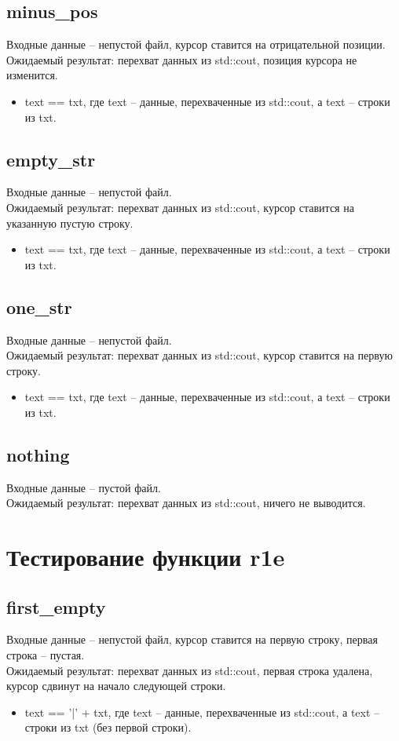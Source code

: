 \documentclass{article}
\begin{document}
\subsection{minus\_pos}
Входные данные -- непустой файл, курсор ставится на отрицательной позиции.\\
Ожидаемый результат: перехват данных из std::cout, позиция курсора не изменится.
\begin{itemize}
    \item text == txt, где text -- данные, перехваченные из std::cout, а text -- строки из txt.
\end{itemize}
\subsection{empty\_str}
Входные данные -- непустой файл.\\
Ожидаемый результат: перехват данных из std::cout, курсор ставится на указанную пустую строку.
\begin{itemize}
    \item text == txt, где text -- данные, перехваченные из std::cout, а text -- строки из txt.
\end{itemize}
\subsection{one\_str}
Входные данные -- непустой файл.\\
Ожидаемый результат: перехват данных из std::cout, курсор ставится на первую строку.
\begin{itemize}
    \item text == txt, где text -- данные, перехваченные из std::cout, а text -- строки из txt.
\end{itemize}
\subsection{nothing}
Входные данные -- пустой файл.\\
Ожидаемый результат: перехват данных из std::cout, ничего не выводится.
\newpage

\section{Тестирование функции r1e}
\subsection{first\_empty}
Входные данные -- непустой файл, курсор ставится на первую строку, первая строка -- пустая.\\
Ожидаемый результат: перехват данных из std::cout, первая строка удалена, курсор сдвинут на начало следующей строки.
\begin{itemize}
    \item text == '|' + txt, где text -- данные, перехваченные из std::cout, а text -- строки из txt (без первой строки).
\end{itemize}
\end{document}
